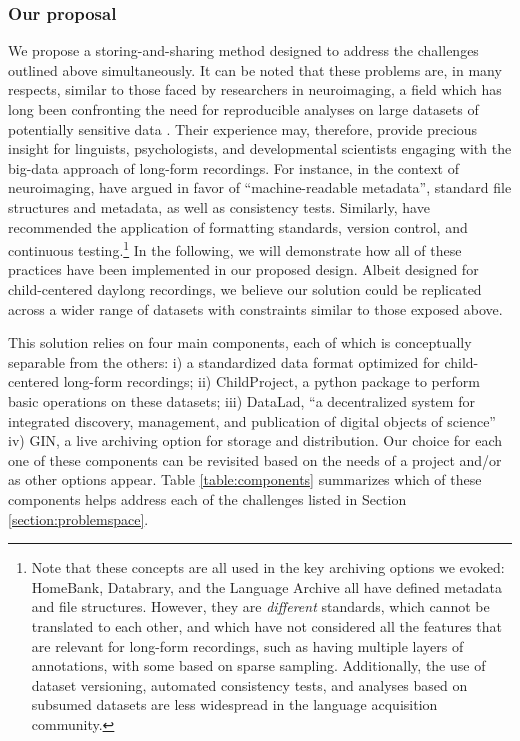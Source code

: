 \documentclass[smallextended]{svjour3}       %
\begin{document}
 \subsubsection*{Our proposal}
 
We propose a storing-and-sharing method designed to address the challenges outlined above simultaneously. It can be noted that these problems are, in many respects, similar to those faced by researchers in neuroimaging, a field which has long been confronting the need for reproducible analyses on large datasets of potentially sensitive data \citep{Poldrack2014}.
Their experience may, therefore, provide precious insight for linguists, psychologists, and developmental scientists engaging with the big-data approach of long-form recordings.
For instance, in the context of neuroimaging, \citet{Gorgolewski2016} have argued in favor of ``machine-readable metadata'', standard file structures and metadata, as well as consistency tests. Similarly, \citet{Eglen2017} have recommended the application of formatting standards, version control, and continuous testing.\footnote{Note that these concepts are all used in the key archiving options we evoked: HomeBank, Databrary, and the Language Archive all have defined metadata and file structures. However, they are {\it different} standards, which cannot be translated to each other, and which have not considered all the features that are relevant for long-form recordings, such as having multiple layers of annotations, with some based on sparse sampling. Additionally, the use of dataset versioning, automated consistency tests, and analyses based on subsumed datasets are less widespread in the language acquisition community.} In the following, we will demonstrate how all of these practices have been implemented in our proposed design.
Albeit designed for child-centered daylong recordings, we believe our solution could be replicated across a wider range of datasets with constraints similar to those exposed above.

This solution relies on four main components, each of which is conceptually separable from the others: i) a standardized data format optimized for child-centered long-form recordings; ii) ChildProject, a python package to perform basic operations on these datasets; iii) DataLad, ``a decentralized system for integrated discovery, management, and publication of digital objects of science'' \citep{hanke_defense_2021} iv) GIN, a live archiving option for storage and distribution. Our choice for each one of these components can be revisited based on the needs of a project and/or as other options appear. Table \ref{table:components} summarizes which of these components helps address each of the challenges listed in Section \ref{section:problemspace}.
\end{document}
